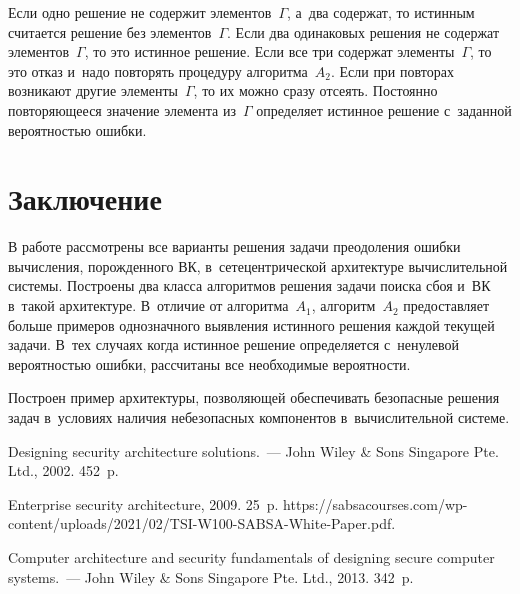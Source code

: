 \begin{multicols}{2}
  Если одно решение не содержит элементов~$\Gamma$, а~два содержат, то 
истинным считается решение без элементов~$\Gamma$. Если два одинаковых 
решения не содержат элементов~$\Gamma$, то это истинное решение. Если все 
три содержат элементы~$\Gamma$, то это отказ и~надо повторять процедуру 
алгоритма~$A_2$. Если при повторах возникают другие элементы~$\Gamma$, то 
их можно сразу отсеять. Постоянно повторяющееся значение элемента 
из~$\Gamma$ определяет истинное решение с~заданной вероятностью ошибки.

  
  \section{Заключение }
  
  
  В работе рассмотрены все варианты решения задачи преодоления ошибки 
вычисления, порожденного ВК, в~сетецентрической архитектуре вы\-чис\-ли\-тель\-ной 
системы. Построены два класса \mbox{алгоритмов} решения задачи поиска сбоя и~ВК 
в~такой архитектуре. В~отличие от алгоритма~$A_1$, алгоритм~$A_2$ 
предоставляет больше примеров однозначного выявления истинного решения 
каждой текущей задачи. В~тех случаях когда истинное решение определяется 
с~ненулевой вероятностью ошибки, рассчитаны все необходимые вероятности.
  
  Построен пример архитектуры, позволяющей обеспечивать безопас\-ные 
решения задач в~условиях наличия небезопасных компонентов в~вычислительной 
сис\-теме.

\vspace*{-5pt}
  
{\small\frenchspacing
 {%
 \begin{thebibliography}{99}
 
 \vspace*{-2pt}
 
 Designing security architecture solutions.~--- John Wiley \& Sons Singapore 
Pte. Ltd., 2002. 452~p.

 Enterprise security architecture, 2009. 25~p. {\sf 
https://sabsacourses.com/wp-content/uploads/2021/02/TSI-W100-SABSA-White-Paper.pdf}.

 Computer architecture and security fundamentals of designing secure 
computer systems.~--- John Wiley \& Sons Singapore Pte. Ltd., 2013. 342~p.


\end{thebibliography}}}
\end{multicols}
